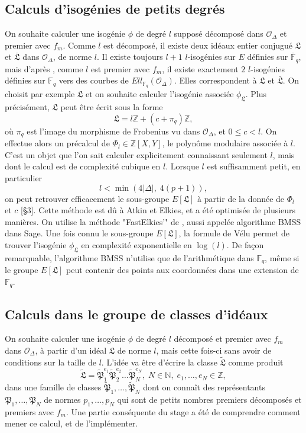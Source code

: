 \documentclass{article}
\newcommand{\N}[0]{\mathbb{N}}
\newcommand{\Z}[0]{\mathbb{Z}}
\newcommand{\OR}[0]{\mathcal{O}}
\newcommand{\LR}[0]{\mathfrak{L}}
\newcommand{\PR}[0]{\mathfrak{P}}
\newcommand{\CL}[0]{\tilde{\LR}}
\newcommand{\CP}[0]{\tilde{\PR}}
\newcommand{\F}[0]{\mathbb{F}}
\theoremstyle{definition}
\theoremstyle{remark}
\begin{document}
	\subsection{Calculs d'isogénies de petits degrés}
	
	On souhaite calculer une isogénie $\phi$ de degré $l$ supposé décomposé dans $\OR_\Delta$ et premier avec $f_m$. Comme $l$ est décomposé, il existe deux idéaux entier conjugué $\LR$ et $\bar{\LR}$ dans $\OR_\Delta$, de norme $l$. Il existe toujours $l+1$ $l$-isogénies sur $E$ définies sur $\bar{\F}_q$, mais d'après \cite{Kohel}, comme $l$ est premier avec $f_m$, il existe exactement $2$ $l$-isogénies définies sur $\F_q$ vers des courbes de $Ell_{\F_q}(\OR_\Delta)$. Elles correspondent à $\LR$ et $\bar{\LR}$. On choisit par exemple $\LR$ et on souhaite calculer l'isogénie associée $\phi_\LR$. Plus précisément, $\LR$ peut être écrit sous la forme 
	\begin{equation*}
		\LR = l\Z + (c + \pi_q)\Z, 
	\end{equation*} 
	où $\pi_q$ est l'image du morphisme de Frobenius vu dans $\OR_\Delta$, et $0\leq c<l$. On effectue alors un précalcul de $\Phi_l\in\Z[X,Y]$, le polynôme modulaire associée à $l$. C'est un objet que l'on sait calculer explicitement connaissant seulement $l$, mais dont le calcul est de complexité cubique en $l$. Lorsque $l$ est suffisamment petit, en particulier 
	\begin{equation*}
	l<\min\left( 4|\Delta|,\;4(p+1)\right),
	\end{equation*}
	on peut retrouver efficacement le sous-groupe $E[\LR]$ à partir de la donnée de $\Phi_l$ et $c$ \cite{BrokerCharlesLauter}[\S 3]. Cette méthode est dû à Atkin et Elkies, et a été optimisée de plusieurs manières. On utilise la méthode "FastElkies'" de \cite{Bostan_2008}, aussi appelée algorithme BMSS dans Sage. Une fois connu le sous-groupe $E[\LR]$, la formule de Vélu \cite{Velu71} permet de trouver l'isogénie $\phi_\LR$ en complexité exponentielle en $\log(l)$. De façon remarquable, l'algorithme BMSS n'utilise que de l'arithmétique dans $\F_q$, même si le groupe $E[\LR]$ peut contenir des points aux coordonnées dans une extension de $\F_q$. 
	
	\subsection{Calculs dans le groupe de classes d'idéaux}
	
	On souhaite calculer une isogénie $\phi$ de degré $l$ décomposé et premier avec $f_m$ dans $\OR_\Delta$, à partir d'un idéal $\LR$ de norme $l$, mais cette fois-ci sans avoir de conditions sur la taille de $l$. L'idée va être d'écrire la classe $\CL$ comme produit 
	\begin{equation}\label{eqclass}
		\CL = \CP_{1}^{e_{1}}\CP_{2}^{e_{2}}\ldots\CP_{N}^{e_{N}},\; N\in\N,\; e_1,\ldots,e_N\in\Z,
	\end{equation}
	dans une famille de classes $\CP_1,\ldots,\CP_N$ dont on connaît des représentants $\PR_1,\ldots,\PR_N$ de normes $p_1,\ldots,p_N$ qui sont de petits nombres premiers décomposés et premiers avec $f_m$. Une partie conséquente du stage a été de comprendre comment mener ce calcul, et de l’implémenter. 
	
\end{document}
